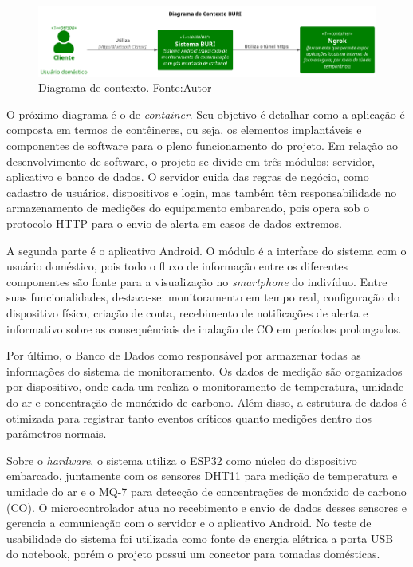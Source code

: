 \begin{figure}[ht]
    \centering
    \includegraphics[width=.87\textwidth]{img/context-diagram.png}
    \caption{Diagrama de contexto. Fonte:Autor}\label{figContextDiagram}
\end{figure}

O próximo diagrama é o de \textit{container}. Seu objetivo é detalhar como a aplicação é composta em termos de contêineres, ou seja, os elementos implantáveis e componentes de software 
para o pleno funcionamento do projeto. Em relação ao desenvolvimento de software, o projeto se divide em três módulos: servidor, aplicativo e banco de dados. O servidor cuida das regras
de negócio, como cadastro de usuários, dispositivos e login, mas também têm responsabilidade no armazenamento de medições do equipamento embarcado, pois opera sob o protocolo HTTP para o envio 
de alerta em casos de dados extremos.

A segunda parte é o aplicativo Android. O módulo é a interface do sistema com o usuário doméstico, pois todo o fluxo de informação entre os 
diferentes componentes são fonte para a visualização no \textit{smartphone} do indivíduo. Entre suas funcionalidades, destaca-se: monitoramento em tempo real, configuração do dispositivo físico, 
criação de conta, recebimento de notificações de alerta e informativo sobre as consequênciais de inalação de CO em períodos prolongados.

Por último, o Banco de Dados como responsável por armazenar todas as informações do sistema de monitoramento. Os dados de medição são organizados por dispositivo, onde 
cada um realiza o monitoramento de temperatura, umidade do ar e concentração de monóxido de carbono. Além disso, a estrutura de dados é otimizada para registrar tanto eventos críticos quanto 
medições dentro dos parâmetros normais.

Sobre o \textit{hardware}, o sistema utiliza o ESP32 como núcleo do dispositivo embarcado, juntamente com os sensores DHT11 para medição de temperatura e umidade do ar e o MQ-7 para 
detecção de concentrações de monóxido de carbono (CO). O microcontrolador atua no recebimento e envio de dados desses sensores e gerencia a comunicação com o servidor e o aplicativo Android. No teste de usabilidade 
do sistema foi utilizada como fonte de energia elétrica a porta USB do notebook, porém o projeto possui um conector para tomadas domésticas.

